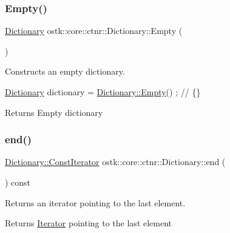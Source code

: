\subsubsection{\texorpdfstring{Empty()}{Empty()}}
{\footnotesize\ttfamily \hyperlink{classostk_1_1core_1_1ctnr_1_1_dictionary}{Dictionary} ostk\+::core\+::ctnr\+::\+Dictionary\+::\+Empty (\begin{DoxyParamCaption}{ }\end{DoxyParamCaption})\hspace{0.3cm}{\ttfamily [static]}}



Constructs an empty dictionary. 


\begin{DoxyCode}
\hyperlink{classostk_1_1core_1_1ctnr_1_1_dictionary_a17166f1489683b8fcc5da6537f29de13}{Dictionary} dictionary = \hyperlink{classostk_1_1core_1_1ctnr_1_1_dictionary_aec25beb38e45838f3211a5932d88853b}{Dictionary::Empty}() ; \textcolor{comment}{// \{\}}
\end{DoxyCode}


\begin{DoxyReturn}{Returns}
Empty dictionary 
\end{DoxyReturn}
\mbox{\label{classostk_1_1core_1_1ctnr_1_1_dictionary_adf80773d868306a53377f0729727f3ee}} 
\subsubsection{\texorpdfstring{end()}{end()}\hspace{0.1cm}{\footnotesize\ttfamily [1/2]}}
{\footnotesize\ttfamily \hyperlink{classostk_1_1core_1_1ctnr_1_1_dictionary_1_1_const_iterator}{Dictionary\+::\+Const\+Iterator} ostk\+::core\+::ctnr\+::\+Dictionary\+::end (\begin{DoxyParamCaption}{ }\end{DoxyParamCaption}) const}



Returns an iterator pointing to the last element. 

\begin{DoxyReturn}{Returns}
\hyperlink{classostk_1_1core_1_1ctnr_1_1_dictionary_1_1_iterator}{Iterator} pointing to the last element 
\end{DoxyReturn}
\mbox{\label{classostk_1_1core_1_1ctnr_1_1_dictionary_a0f16b95b70f70e19be6ce4d150584af6}} 
